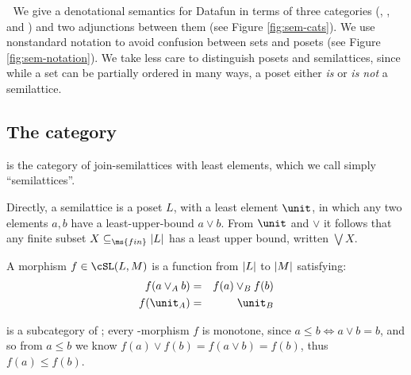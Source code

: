 
We give a denotational semantics for Datafun in terms of three categories
(\cSet{}, \cPoset{}, and \cSL{}) and two adjunctions between them (see Figure
\ref{fig:sem-cats}). We use nonstandard notation to avoid confusion between sets
and posets (see Figure \ref{fig:sem-notation}). We take less care to distinguish
posets and semilattices, since while a set can be partially ordered in many
ways, a poset either \emph{is} or \emph{is not} a semilattice.

\subsection{The category \cSL{}}

\cSL{} is the category of join-semilattices with least elements, which we call
simply ``semilattices''.

Directly, a semilattice is a poset $L$, with a least element $\unit$, in which
any two elements $a,b$ have a least-upper-bound $a \vee b$. From $\unit$ and
$\vee$ it follows that any finite subset $X \subseteq_{\ms{fin}} \U{L}$ has a
least upper bound, written $\bigvee X$.

A morphism $f \in \cSL(L, M)$ is a function from $|L|$ to $|M|$ satisfying:
\begin{eqnarray*}
  f(a \vee_A b) &=& f(a) \vee_B f(b)\\
  f(\unit_A) &=& \unit_B
\end{eqnarray*}

\cSL{} is a subcategory of ; every \cSL{}-morphism $f$ is monotone,
since $a \le b \iff a \vee b = b$, and so from $a \le b$ we know $f(a) \vee f(b)
= f(a \vee b) = f(b)$, thus $f(a) \le f(b)$.

